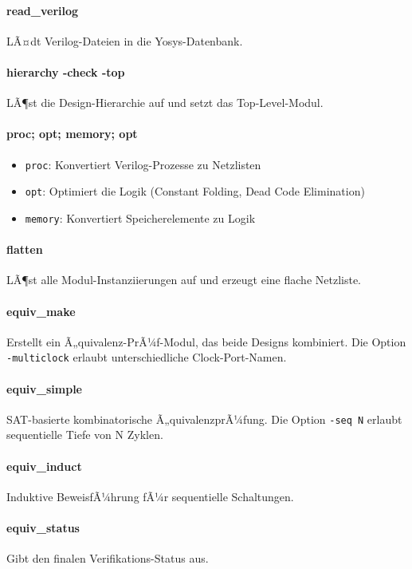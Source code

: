 ﻿\documentclass[12pt,a4paper]{report}
\begin{document}
\paragraph{read\_verilog}
LÃ¤dt Verilog-Dateien in die Yosys-Datenbank.

\paragraph{hierarchy -check -top}
LÃ¶st die Design-Hierarchie auf und setzt das Top-Level-Modul.

\paragraph{proc; opt; memory; opt}
\begin{itemize}
    \item \texttt{proc}: Konvertiert Verilog-Prozesse zu Netzlisten
    \item \texttt{opt}: Optimiert die Logik (Constant Folding, Dead Code Elimination)
    \item \texttt{memory}: Konvertiert Speicherelemente zu Logik
\end{itemize}

\paragraph{flatten}
LÃ¶st alle Modul-Instanziierungen auf und erzeugt eine flache Netzliste.

\paragraph{equiv\_make}
Erstellt ein Ã„quivalenz-PrÃ¼f-Modul, das beide Designs kombiniert. Die Option \texttt{-multiclock} erlaubt unterschiedliche Clock-Port-Namen.

\paragraph{equiv\_simple}
SAT-basierte kombinatorische Ã„quivalenzprÃ¼fung. Die Option \texttt{-seq N} erlaubt sequentielle Tiefe von N Zyklen.

\paragraph{equiv\_induct}
Induktive BeweisfÃ¼hrung fÃ¼r sequentielle Schaltungen.

\paragraph{equiv\_status}
Gibt den finalen Verifikations-Status aus.
\end{document}
